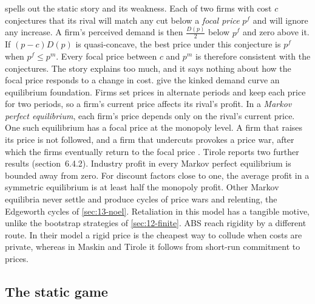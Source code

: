 \citet[section~6.2.1]{Tirole1988} spells out the static story and its weakness. Each of two firms with cost $c$
conjectures that its rival will match any cut below a \emph{focal price} $p^f$ and will ignore any increase. A firm's
perceived demand is then $\frac{D(p)}{2}$ below $p^f$ and zero above it. If $(p - c)D(p)$ is quasi-concave, the best
price under this conjecture is $p^f$ when $p^f \le p^m$. Every focal price between $c$ and $p^m$ is therefore
consistent with the conjectures. The story explains too much, and it says nothing about how the focal price responds
to a change in cost. \citet{MaskinTirole1988} give the kinked demand curve an equilibrium foundation. Firms set prices
in alternate periods and keep each price for two periods, so a firm's current price affects its rival's profit. In a
\emph{Markov perfect equilibrium}, each firm's price depends only on the rival's current price. One such equilibrium
has a focal price at the monopoly level. A firm that raises its price is not followed, and a firm that undercuts
provokes a price war, after which the firms eventually return to the focal price \citep[section~6.4.1]{Tirole1988}. Tirole
reports two further results (section~6.4.2). Industry profit in every Markov perfect equilibrium is bounded away from
zero. For discount factors close to one, the average profit in a symmetric equilibrium is at least half the monopoly
profit. Other Markov equilibria never settle and produce cycles of price wars and relenting, the Edgeworth
cycles of \cref{sec:13-noel}. Retaliation in this model has a tangible motive, unlike the bootstrap strategies of
\cref{sec:12-finite}. ABS reach rigidity by a different route. In their model a rigid price is the cheapest way to
collude when costs are private, whereas in Maskin and Tirole it follows from short-run commitment to prices.

\subsection{The static game}\label{sec:12-abs-static}

